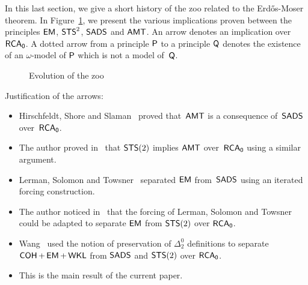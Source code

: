 
In this last section, we give a short history of the zoo related to the Erd\H{o}s-Moser theorem.
In Figure~\ref{fig:local-zoo}, we present the various implications proven
between the principles $\operatorname{\sf{EM}}$, $\operatorname{\sf{STS}}^2$, $\operatorname{\sf{SADS}}$ and $\operatorname{\sf{AMT}}$. An arrow
denotes an implication over $\operatorname{\sf{RCA}_0}$. A dotted arrow from a principle $\mathsf{P}$
to a principle $\mathsf{Q}$ denotes the existence of an $\omega$-model of $\mathsf{P}$ which is not a model of~$\mathsf{Q}$.

\begin{figure}[htbp]
\begin{center}
\end{center}
\caption{Evolution of the zoo}\label{fig:local-zoo}
\end{figure}

Justification of the arrows:
\begin{itemize}
	\item[(1)] Hirschfeldt, Shore and Slaman~\cite{Hirschfeldt2009atomic} proved that~$\operatorname{\sf{AMT}}$ is a consequence of~$\operatorname{\sf{SADS}}$ over~$\operatorname{\sf{RCA}_0}$. 
	\item[(2)] The author proved in~\cite{Patey2015Somewhere} that $\operatorname{\sf{STS}}(2)$ implies $\operatorname{\sf{AMT}}$ over~$\operatorname{\sf{RCA}_0}$ using a similar argument.
	\item[(3)] Lerman, Solomon and Towsner~\cite{Lerman2013Separating} separated $\operatorname{\sf{EM}}$ from~$\operatorname{\sf{SADS}}$ using an iterated forcing construction.
	\item[(4)] The author noticed in~\cite{Patey2013note} that the forcing of Lerman, Solomon and Towsner
	could be adapted to separate $\operatorname{\sf{EM}}$ from $\operatorname{\sf{STS}}(2)$ over $\operatorname{\sf{RCA}_0}$.
	\item[(5)] Wang~\cite{Wang2014Definability} used the notion of preservation of $\Delta^0_2$ definitions
	to separate $\operatorname{\sf{COH}}+\operatorname{\sf{EM}}+\operatorname{\sf{WKL}}$ from $\operatorname{\sf{SADS}}$ and $\operatorname{\sf{STS}}(2)$ over $\operatorname{\sf{RCA}_0}$.
	\item[(6)] This is the main result of the current paper.
\end{itemize}


